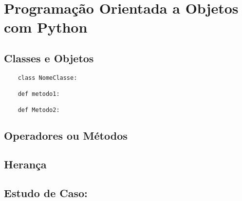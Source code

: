 

\chapter{ Programa\c{c}\~{a}o Orientada a Objetos com Python}



    \section{Classes e Objetos}


   \begin{lstlisting}
    class NomeClasse:

    def metodo1:

    def Metodo2:

    \end{lstlisting}

    \section{Operadores ou M\'{e}todos}


    \section{Heran\c{c}a}


    \section{Estudo de Caso: }
